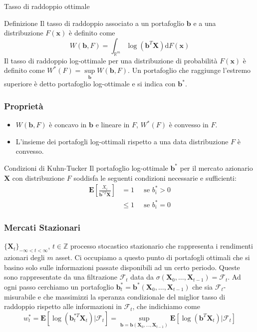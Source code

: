 \documentclass{beamer}
\theoremstyle{plain}
\theoremstyle{definition}
\theoremstyle{remark}
\newcommand{\R}{\mathbb{R}}
\newcommand{\Z}{\mathbb{Z}}
\newcommand{\dFX}{\text{d}F(\bm{x})}
\newcommand{\X}{\bm{X}}
\newcommand{\B}{\bm{b}}
\newcommand{\F}{\mathcal{F}}
\newcommand{\E}{\mathbf{E}}
\begin{document}
\begin{frame}{Tasso di raddoppio ottimale}
	\begin{block}{Definizione}
		Il tasso di raddoppio associato a un portafoglio $\bm{b}$ e a una distribuzione $F(\bm{x})$ è definito come
		\begin{equation*}
		W(\bm{b},F) = \int_{\R^m}{\log(\bm{b}^T\bm{X})\dFX}
		\end{equation*}
		Il tasso di raddoppio log-ottimale per una distribuzione di probabilità $F(\bm{x})$ è definito come $
		W^*(F) = \sup\limits_{\bm{b}}W(\bm{b},F)$.\newline
		Un portafoglio che raggiunge l'estremo superiore è detto portafoglio log-ottimale e si indica con $\bm{b}^*$.
	\end{block}
\end{frame}

\begin{frame}[label=KT]
	\frametitle{Proprietà}
	\begin{itemize}
		\item $W(\B,F)$ è concavo in $\B$ e lineare in $F$, $W^*(F)$ è convesso in $F$.
		\item L'insieme dei portafogli log-ottimali rispetto a una data distribuzione $F$ è convesso.
	\end{itemize}
	\begin{block}{Condizioni di Kuhn-Tucker}
		Il portafoglio log-ottimale $\B^*$ per il mercato azionario $\X$ con distribuzione $F$ soddisfa le seguenti condizioni necessarie e sufficienti:
		\begin{equation*}
		\begin{split}
		\mathbf{E}\left[\frac{X_i}{\B^{*T}\X}\right] & = 1 \;\;\;\;\; \text{se } b_i^*>0\\
		& \leq 1 \;\;\;\;\; \text{se } b_i^*=0
		\end{split}
		\end{equation*}
	\end{block}
	\hyperlink{KTdim}{}
\end{frame}


\begin{frame}
	\frametitle{Mercati Stazionari}
	 $\{\X_t\}_{-\infty<t<\infty}$, $t\in \Z$ processo stocastico stazionario che rappresenta i rendimenti azionari degli $m$ asset.\newline
	 Ci occupiamo a questo punto di portafogli ottimali che si basino solo sulle informazioni passate disponibili ad un certo periodo. Queste sono rappresentate da una filtrazione $\F_t$ data da $\sigma(\X_0,\ldots,\X_{t-1})= \F_t$. Ad ogni passo cerchiamo un portafoglio $\B_t^*=\B^*(\X_0,\ldots,\X_{t-1})$ che sia $\F_t$-misurabile e che massimizzi la speranza condizionale del miglior tasso di raddoppio rispetto alle informazioni in $\mathcal{F}_t$, che indichiamo come
	 	\begin{equation*}
	 	w_t^*=\E[\log(\B_t^{*T}\X_t)|\F_t] = \sup\limits_{\bm{b}=\B(\X_0,\ldots, \X_{t-1})}\E[\log(\B^T\X_t)|\F_t]	 	
	 	\end{equation*}
\end{frame}
\end{document}
